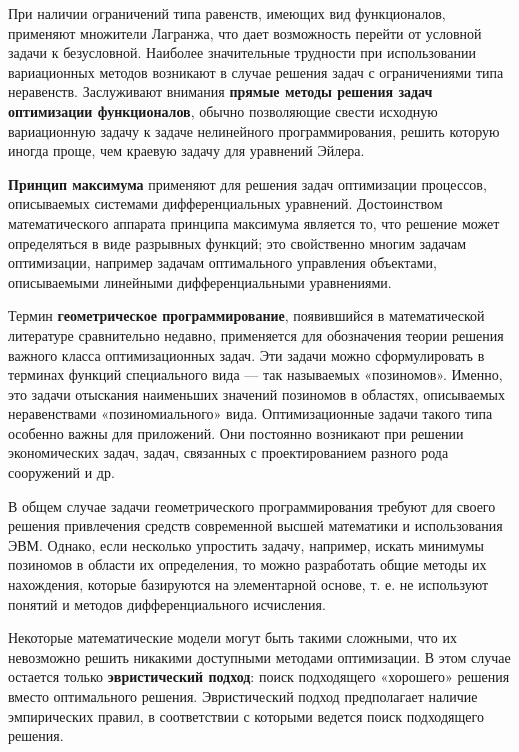 При наличии ограничений типа равенств, имеющих вид функционалов,
применяют множители Лагранжа, что дает возможность перейти от условной
задачи к безусловной. Наиболее значительные трудности при
использовании вариационных методов возникают в случае решения задач с
ограничениями типа неравенств. Заслуживают внимания \textbf{прямые методы
решения задач оптимизации функционалов}, обычно позволяющие свести
исходную вариационную задачу к задаче нелинейного программирования,
решить которую иногда проще, чем краевую задачу для уравнений Эйлера.


\textbf{Принцип максимума} применяют для решения задач оптимизации процессов,
описываемых системами дифференциальных уравнений. Достоинством
математического аппарата принципа максимума является то, что решение
может определяться в виде разрывных функций; это свойственно многим
задачам оптимизации, например задачам оптимального управления
объектами, описываемыми линейными дифференциальными уравнениями.

Термин \textbf{геометрическое программирование}, появившийся в
математической литературе сравнительно недавно, применяется для
обозначения теории решения важного класса оптимизационных задач. Эти
задачи можно сформулировать в терминах функций специального вида — так
называемых «позиномов». Именно, это задачи отыскания наименьших
значений позиномов в областях, описываемых неравенствами
«позиномиального» вида. Оптимизационные задачи такого типа особенно
важны для приложений. Они постоянно возникают при решении
экономических задач, задач, связанных с проектированием разного рода
сооружений и др.

В общем случае задачи геометрического программирования требуют для
своего решения привлечения средств современной высшей математики и
использования ЭВМ. Однако, если несколько упростить задачу, например,
искать минимумы позиномов в области их определения, то можно
разработать общие методы их нахождения, которые базируются на
элементарной основе, т. е. не используют понятий и методов
дифференциального исчисления.


Некоторые математические модели могут быть такими сложными, что их
невозможно решить никакими доступными методами оптимизации. В этом
случае остается только \textbf{эвристический подход}: поиск подходящего
«хорошего» решения вместо оптимального решения. Эвристический подход
предполагает наличие эмпирических правил, в соответствии с которыми
ведется поиск подходящего решения.

\newpage